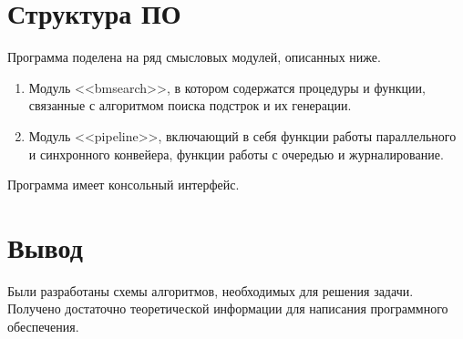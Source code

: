 \section{Структура ПО}
Программа поделена на ряд смысловых модулей, описанных ниже.
\begin{enumerate}
	\item Модуль <<bmsearch>>, в котором содержатся процедуры и функции, связанные с алгоритмом поиска подстрок и их генерации.
	\item Модуль <<pipeline>>, включающий в себя функции работы параллельного и синхронного конвейера, функции работы с очередью и журналирование.
\end{enumerate}
Программа имеет консольный интерфейс. 

\section{Вывод}
Были разработаны схемы алгоритмов, необходимых для решения задачи. Получено достаточно теоретической информации для написания программного обеспечения.
